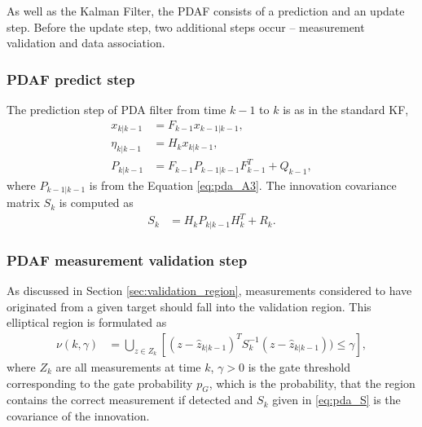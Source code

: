 As well as the Kalman Filter, the PDAF consists of a prediction and an update step. Before the update step, two
additional steps occur -- measurement validation and data association.
 \subsubsection{PDAF predict step}
The prediction step of PDA filter from time $k-1$ to $k$ is as in the standard KF,
\begin{align}
    x_{k|k-1} &= F_{k-1}x_{k-1|k-1},\\
    \eta_{k|k-1} &= H_k x_{k|k-1},\\
    P_{k|k-1} &= F_{k-1} P_{k-1|k-1} F_{k-1}^T + Q_{k-1},
\end{align}
where $P_{k-1|k-1}$ is from the Equation \eqref{eq:pda_A3}. The innovation covariance matrix $S_k$ is computed as
\begin{align}
    S_k &= H_{k} P_{k|k-1} H_{k}^T + R_{k}. \label{eq:pda_S}
\end{align}

\subsubsection{PDAF measurement validation step}
As discussed in Section \ref{sec:validation_region}, measurements considered to have originated from a given target
should fall into the validation region. This elliptical region is formulated as
\begin{align}
    \nu(k,\gamma) &= \bigcup_{z \in Z_k}[(z - \hat{z}_{k|k-1})^T S_k^{-1} (z - \hat{z}_{k|k-1})) \leq \gamma], \label {eq:validation_region}
\end{align}
where $Z_k$ are all measurements at time $k$, $\gamma>0$ is the gate threshold corresponding to the gate probability $
p_G$, which is the probability, that the region contains the correct measurement if detected and $S_k$ given in \eqref{eq:pda_S} is the covariance of the innovation.

